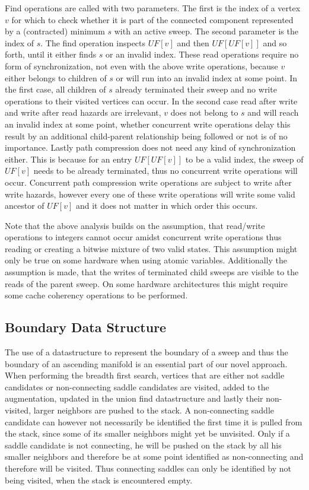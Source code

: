 \documentclass{scrartcl}
\begin{document}
Find operations are called with two parameters. The first is the index of a vertex \(v\) for which to check whether it is part of the connected component represented by a (contracted) minimum \(s\) with an active sweep. The second parameter is the index of \(s\). The find operation inspects \(UF[v]\) and then \(UF[UF[v]]\) and so forth, until it either finds \(s\) or an invalid index. These read operations require no form of synchronization, not even with the above write operations, because \(v\) either belongs to children of \(s\) or will run into an invalid index at some point. In the first case, all children of \(s\) already terminated their sweep and no write operations to their visited vertices can occur. In the second case read after write and write after read hazards are irrelevant, \(v\) does not belong to \(s\) and will reach an invalid index at some point, whether concurrent write operations delay this result by an additional child-parent relationship being followed or not is of no importance. Lastly path compression does not need any kind of synchronization either. This is because for an entry \(UF[UF[v]]\) to be a valid index, the sweep of \(UF[v]\) needs to be already terminated, thus no concurrent write operations will occur. Concurrent path compression write operations are subject to write after write hazards, however every one of these write operations will write some valid ancestor of \(UF[v]\) and it does not matter in which order this occurs.

Note that the above analysis builds on the assumption, that read/write operations to integers cannot occur amidst concurrent write operations thus reading or creating a bitwise mixture of two valid states. This assumption might only be true on some hardware when using atomic variables.
Additionally the assumption is made, that the writes of terminated child sweeps are visible to the reads of the parent sweep. On some hardware architectures this might require some cache coherency operations to be performed.

\subsection{Boundary Data Structure}
The use of a datastructure to represent the boundary of a sweep and thus the boundary of an ascending manifold is an essential part of our novel approach. When performing the breadth first search, vertices that are either not saddle candidates or non-connecting saddle candidates are visited, added to the augmentation, updated in the union find datastructure and lastly their non-visited, larger neighbors are pushed to the stack. A non-connecting saddle candidate can however not necessarily be identified the first time it is pulled from the stack, since some of its smaller neighbors might yet be unvisited. Only if a saddle candidate is not connecting, he will be pushed on the stack by all his smaller neighbors and therefore be at some point identified as non-connecting and therefore will be visited. Thus connecting saddles can only be identified by not being visited, when the stack is encountered empty. 
\end{document}
